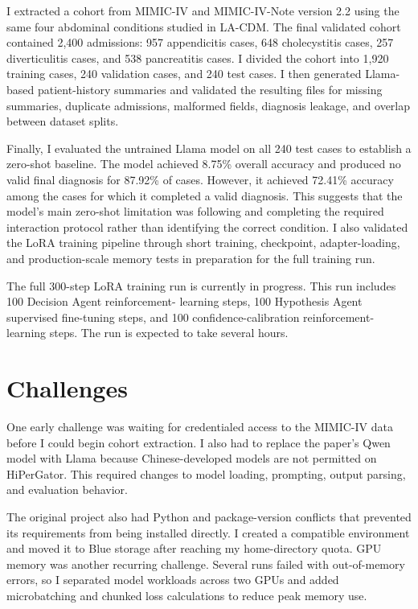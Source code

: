 \documentclass[11pt]{article}
\begin{document}
I extracted a cohort from MIMIC-IV and MIMIC-IV-Note version 2.2 using the same four abdominal conditions studied in 
LA-CDM. The final validated cohort contained 2,400 admissions: 957 appendicitis cases, 648 cholecystitis cases,
257 diverticulitis cases, and 538 pancreatitis cases. I divided the cohort into 1,920 training cases, 240 validation 
cases, and 240 test cases. I then generated Llama-based patient-history summaries and validated the resulting files for
missing summaries, duplicate admissions, malformed fields, diagnosis leakage, and overlap between dataset splits.

Finally, I evaluated the untrained Llama model on all 240 test cases to establish a zero-shot baseline. The model 
achieved 8.75\% overall accuracy and produced no valid final diagnosis for 87.92\% of cases. However, it achieved 
72.41\% accuracy among the cases for which it completed a valid diagnosis. This suggests that the model's main 
zero-shot limitation was following and completing the required interaction protocol rather than identifying the correct 
condition. I also validated the LoRA training pipeline through short training, checkpoint, adapter-loading, and 
production-scale memory tests in preparation for the full training run.

The full 300-step LoRA training run is currently in progress. This run includes 100 Decision Agent reinforcement-
learning steps, 100 Hypothesis Agent supervised fine-tuning steps, and 100 confidence-calibration reinforcement-
learning steps. The run is expected to take several hours.

\section{Challenges}

One early challenge was waiting for credentialed access to the MIMIC-IV data before I could begin cohort extraction.
I also had to replace the paper's Qwen model with Llama because Chinese-developed models are not permitted on
HiPerGator. This required changes to model loading, prompting, output parsing, and evaluation behavior.

The original project also had Python and package-version conflicts that prevented its requirements from being installed
directly. I created a compatible environment and moved it to Blue storage after reaching my home-directory quota. GPU
memory was another recurring challenge. Several runs failed with out-of-memory errors, so I separated model workloads
across two GPUs and added microbatching and chunked loss calculations to reduce peak memory use.
\end{document}
